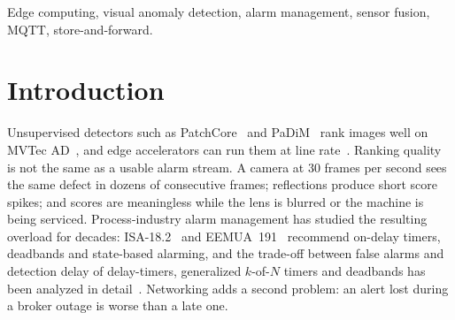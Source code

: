 \documentclass[conference]{IEEEtran}
\begin{document}
\begin{abstract}
frame-budget misses from \LatGpuSyncMiss{} to \LatGpuAsyncMiss{} of cycles, but did not remove them.
\end{abstract}

\begin{IEEEkeywords}
Edge computing, visual anomaly detection, alarm management, sensor fusion, MQTT, store-and-forward.
\end{IEEEkeywords}

\section{Introduction}
Unsupervised detectors such as PatchCore~\cite{roth2022patchcore} and PaDiM~\cite{defard2021padim} rank images well on MVTec AD~\cite{bergmann2019mvtec,bergmann2021mvtec}, and edge accelerators can run them at line rate~\cite{chen2019edge}. Ranking quality is not the same as a usable alarm stream. A camera at 30 frames per second sees the same defect in dozens of consecutive frames; reflections produce short score spikes; and scores are meaningless while the lens is blurred or the machine is being serviced. Process-industry alarm management has studied the resulting overload for decades: ISA-18.2~\cite{isa182} and EEMUA~191~\cite{eemua191} recommend on-delay timers, deadbands and state-based alarming, and the trade-off between false alarms and detection delay of delay-timers, generalized $k$-of-$N$ timers and deadbands has been analyzed in detail~\cite{adnan2011delay,adnan2013generalized,afzal2018deadband,wang2016alarm,goel2017alarm}. Networking adds a second problem: an alert lost during a broker outage is worse than a late one.
\end{document}
